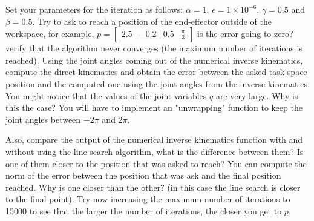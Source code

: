 \documentclass[11pt]{article}
\begin{document}
Set your parameters for the iteration as follows: $\alpha = 1$, $\epsilon = 1 \times 10^{-6}$, $\gamma = 0.5$ and $\beta = 0.5$. Try to ask to reach a position of the end-effector outside of the workspace, for example, $p = \begin{bmatrix}	2.5 & -0.2 & 0.5 & \frac{\pi}{3}\end{bmatrix}$ is the error going to zero? verify that the algorithm never converges (the maximum number of iterations is reached). Using the joint angles coming out of the numerical inverse kinematics, compute the direct kinematics and obtain the error between the asked task space position and the computed one using the joint angles from the inverse kinematics. You might notice that the values of the joint variables $q$ are very large. Why is this the case? You will have to implement an "unwrapping" function to keep the joint angles between $-2\pi$ and $2\pi$. 

Also, compare the output of the numerical inverse kinematics function with and without using the line search algorithm, what is the difference between them? 
Is one of them closer to the position that was asked to reach? You can compute the norm of the error between the position that was ask and the final position reached. Why is one closer than the other? (in this case the line search is closer to the final point). Try now increasing the maximum number of iterations to 15000 to see that the larger the number of iterations, the closer you get to $p$. 
\end{document}
